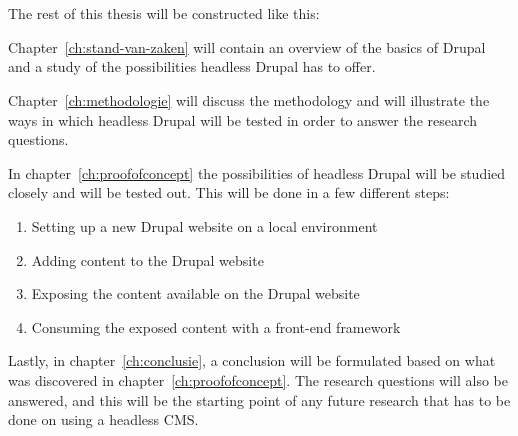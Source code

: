 \section{}
\label{sec:opzet-bachelorproef}


The rest of this thesis will be constructed like this:

Chapter~\ref{ch:stand-van-zaken} will contain an overview of the basics of Drupal and a study of the possibilities headless Drupal has to offer.

Chapter~\ref{ch:methodologie} will discuss the methodology and will illustrate the ways in which headless Drupal will be tested in order to answer the research questions.

In chapter~\ref{ch:proofofconcept} the possibilities of headless Drupal will be studied closely and will be tested out. This will be done in a few different steps:

\begin{enumerate}
	\item Setting up a new Drupal website on a local environment
	\item Adding content to the Drupal website
	\item Exposing the content available on the Drupal website
	\item Consuming the exposed content with a front-end framework
\end{enumerate}


Lastly, in chapter~\ref{ch:conclusie}, a conclusion will be formulated based on what was discovered in chapter~\ref{ch:proofofconcept}. The research questions will also be answered, and this will be the starting point of any future research that has to be done on using a headless CMS.